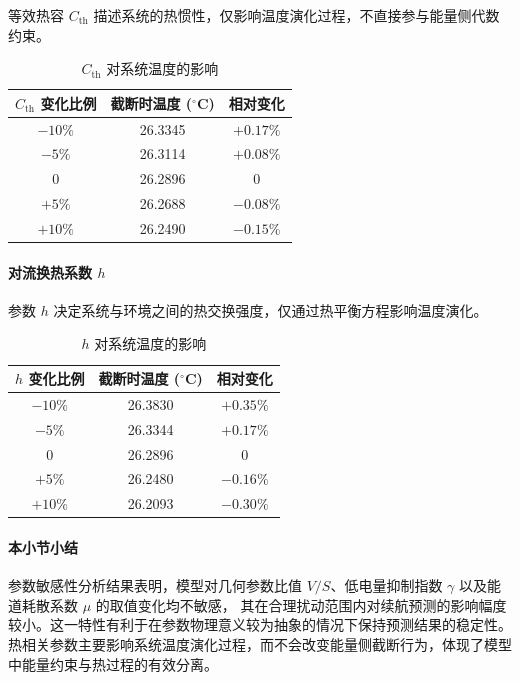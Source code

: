 \documentclass[11pt]{article}
\begin{document}
等效热容 $C_{\mathrm{th}}$ 描述系统的热惯性，仅影响温度演化过程，不直接参与能量侧代数约束。

\begin{table}[H]
\centering
\caption{$C_{\mathrm{th}}$ 对系统温度的影响}
\begin{tabular}{ccc}
\hline
$C_{\mathrm{th}}$ 变化比例 & 截断时温度 ($^\circ$C) & 相对变化 \\ \hline
$-10\%$ & 26.3345 & $+0.17\%$ \\
$-5\%$  & 26.3114 & $+0.08\%$ \\
$0$     & 26.2896 & $0$ \\
$+5\%$  & 26.2688 & $-0.08\%$ \\
$+10\%$ & 26.2490 & $-0.15\%$ \\ \hline
\end{tabular}
\end{table}

\paragraph{对流换热系数 $h$}

参数 $h$ 决定系统与环境之间的热交换强度，仅通过热平衡方程影响温度演化。

\begin{table}[H]
\centering
\caption{$h$ 对系统温度的影响}
\begin{tabular}{ccc}
\hline
$h$ 变化比例 & 截断时温度 ($^\circ$C) & 相对变化 \\ \hline
$-10\%$ & 26.3830 & $+0.35\%$ \\
$-5\%$  & 26.3344 & $+0.17\%$ \\
$0$     & 26.2896 & $0$ \\
$+5\%$  & 26.2480 & $-0.16\%$ \\
$+10\%$ & 26.2093 & $-0.30\%$ \\ \hline
\end{tabular}
\end{table}

\paragraph{本小节小结}  
参数敏感性分析结果表明，模型对几何参数比值 $V/S$、低电量抑制指数 $\gamma$ 以及能道耗散系数 $\mu$ 的取值变化均不敏感，
其在合理扰动范围内对续航预测的影响幅度较小。这一特性有利于在参数物理意义较为抽象的情况下保持预测结果的稳定性。
热相关参数主要影响系统温度演化过程，而不会改变能量侧截断行为，体现了模型中能量约束与热过程的有效分离。
\end{document}
